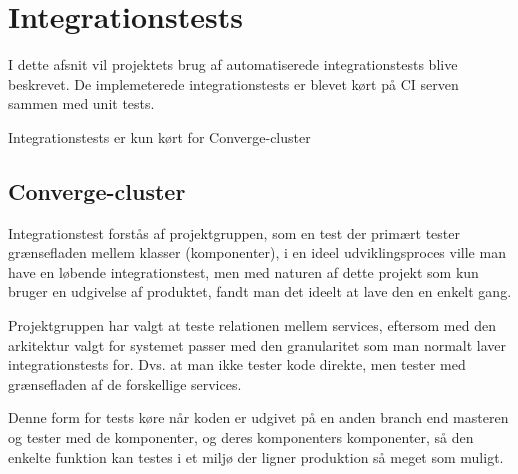 \section{Integrationstests}

I dette afsnit vil projektets brug af automatiserede integrationstests blive beskrevet. De implemeterede integrationstests er blevet kørt på CI serven sammen med unit tests.

Integrationstests er kun kørt for Converge-cluster

\subsection{Converge-cluster}

Integrationstest forstås af projektgruppen, som en test der primært tester grænsefladen mellem klasser (komponenter), i en ideel udviklingsproces ville man have en løbende integrationstest, men med naturen af dette projekt som kun bruger en udgivelse af produktet, fandt man det ideelt at lave den en enkelt gang. 

Projektgruppen har valgt at teste relationen mellem services, eftersom med den arkitektur valgt for systemet passer med den granularitet som man normalt laver integrationstests for. Dvs. at man ikke tester kode direkte, men tester med grænsefladen af de forskellige services.

Denne form for tests køre når koden er udgivet på en anden branch end masteren og tester med de komponenter, og deres komponenters komponenter, så den enkelte funktion kan testes i et miljø der ligner produktion så meget som muligt.